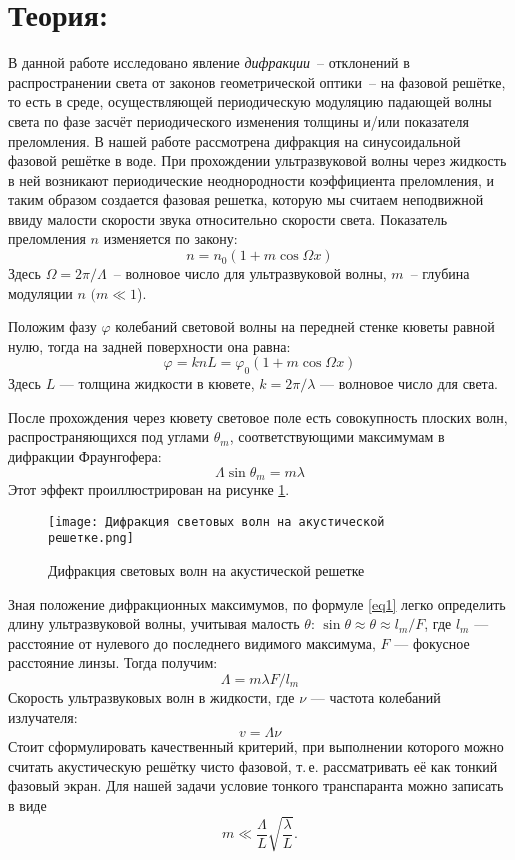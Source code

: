 \documentclass[a4paper, 12pt]{article}
\begin{document}
\large\section{Теория:}
В данной работе исследовано явление \textit{дифракции}~-- отклонений в распространении света от законов геометрической оптики~-- на фазовой решётке, то есть в среде, осуществляющей периодическую модуляцию падающей волны света по фазе засчёт периодического изменения толщины и/или показателя преломления. В нашей работе рассмотрена дифракция на синусоидальной фазовой решётке в воде. При прохождении ультразвуковой волны через жидкость в ней возникают периодические неоднородности коэффициента преломления, и таким образом создается фазовая решетка, которую мы считаем неподвижной ввиду малости скорости звука относительно скорости света. Показатель преломления $n$ изменяется по закону:
\begin{equation*}
    n = n_0 (1 + m \cos \Omega x)
\end{equation*}
Здесь $\Omega = 2 \pi / \Lambda$~-- волновое число для ультразвуковой волны, $m$~-- глубина модуляции $ n $ $ (m \ll 1 $).
	
Положим фазу $ \varphi $ колебаний световой волны на передней стенке кюветы равной нулю, тогда на задней поверхности она равна:
\begin{equation*}
    \varphi  = k n L = \varphi_0 (1 + m \cos \Omega x)
\end{equation*}
Здесь $ L $ --- толщина жидкости в кювете, $ k = 2 \pi / \lambda $ --- волновое число для света.

После прохождения через кювету световое поле есть совокупность плоских волн, распространяющихся под углами $ \theta_m$, соответствующими максимумам в дифракции Фраунгофера:
\begin{equation}\label{eq1}	
    \Lambda \sin \theta_m = m \lambda
\end{equation}
Этот эффект проиллюстрирован на рисунке \ref{diff}.
\begin{figure}[h!]
    \centering	
    \texttt{[image: Дифракция световых волн на акустической решетке.png]}
    \caption{Дифракция световых волн на акустической решетке}
    \label{diff}
\end{figure}

Зная положение дифракционных максимумов, по формуле \eqref{eq1} легко определить длину ультразвуковой волны, учитывая малость $ \theta $: $ \sin \theta \approx \theta \approx l_m /F  $, где $ l_m $ --- расстояние от нулевого до последнего видимого максимума, $ F $ --- фокусное расстояние линзы. Тогда получим:
\begin{equation}
    \label{eq:1}
    \Lambda = m \lambda F/ l_m 
\end{equation}
Скорость ультразвуковых волн в жидкости, где $ \nu $ --- частота колебаний излучателя:
\begin{equation}
    v = \Lambda \nu 
\end{equation}
Стоит сформулировать качественный критерий, при выполнении
которого можно считать акустическую решётку чисто фазовой, т.\,е. рассматривать её как тонкий фазовый экран. Для нашей задачи условие
тонкого транспаранта можно записать в виде
\[
m\ll \frac{\Lambda}{L}\sqrt{\frac{\lambda}{L}}.
\]
\end{document}
